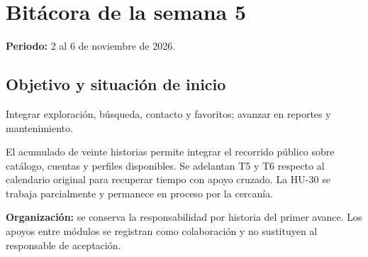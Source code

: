 \section{Bitácora de la semana 5}
\textbf{Periodo:} 2 al 6 de noviembre de 2026.

\notaBorrador

\subsection{Objetivo y situación de inicio}
Integrar exploración, búsqueda, contacto y favoritos; avanzar en reportes y mantenimiento.

El acumulado de veinte historias permite integrar el recorrido público sobre catálogo, cuentas y perfiles disponibles. Se adelantan T5 y T6 respecto al calendario original para recuperar tiempo con apoyo cruzado. La HU-30 se trabaja parcialmente y permanece en proceso por la cercanía.

\textbf{Organización:} se conserva la responsabilidad por historia del primer avance. Los apoyos entre módulos se registran como colaboración y no sustituyen al responsable de aceptación.


